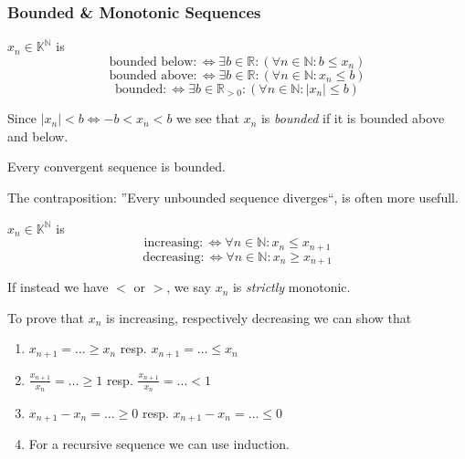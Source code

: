\subsubsection{Bounded \& Monotonic Sequences}
\begin{definition}
   \(x_n \in \mathbb{K}^\mathbb{N}\) is
   \[\text{bounded below} :\iff \exists b \in \mathbb{R}: (\forall n \in \mathbb{N}: b \leq x_n)\]
   \[\text{bounded above} :\iff \exists b \in \mathbb{R}: (\forall n \in \mathbb{N}: x_n \leq b)\]
   \[\text{bounded} :\iff \exists b \in \mathbb{R}_{>0}: (\forall n \in \mathbb{N}: |x_n| \leq b)\]
\end{definition}
\begin{remark}
   Since \(\lvert x_n \rvert < b \iff -b < x_n < b\) we see that \(x_n\) is \emph{bounded} if it is bounded above and below.
\end{remark}

\begin{theorem}\label{thm:conv_bound}
   Every convergent sequence is bounded.
\end{theorem}
\begin{remark}
   The contraposition: ''Every unbounded sequence diverges``, is often more usefull.
\end{remark}

\begin{definition}
   \(x_n \in \mathbb{K}^\mathbb{N}\) is
   \[\text{increasing} :\iff \forall n \in \mathbb{N}: x_n \leq x_{n+1}\]
   \[\text{decreasing} :\iff \forall n \in \mathbb{N}: x_n \geq x_{n+1}\]
\end{definition}
\begin{remark}[Terminology]
   If instead we have \(<\) or \(>\), we say \(x_n\) is \emph{strictly} monotonic.
\end{remark}
\begin{remark}[Tips]
   To prove that \(x_n\) is increasing, respectively decreasing we can show that
   \begin{enumerate}
      \item \(x_{n+1} = \ldots \geq x_n\) resp. \(x_{n+1} = \ldots \leq x_n\)
      \item \(\frac{x_{n+1}}{x_n} = \ldots \geq 1\) resp. \(\frac{x_{n+1}}{x_n} = \ldots < 1\)
      \item \(x_{n+1} - x_n = \ldots \geq 0\) resp. \(x_{n+1} - x_n = \ldots \leq 0\)
      \item For a recursive sequence we can use induction.
   \end{enumerate}
\end{remark}

